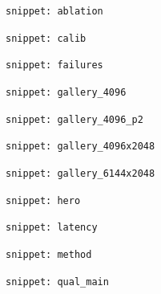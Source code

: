 \documentclass{article}
\begin{document}
\noindent\texttt{snippet: ablation}\par
\clearpage
\noindent\texttt{snippet: calib}\par
\clearpage
\noindent\texttt{snippet: failures}\par
\clearpage
\noindent\texttt{snippet: gallery\_4096}\par
\clearpage
\noindent\texttt{snippet: gallery\_4096\_p2}\par
\clearpage
\noindent\texttt{snippet: gallery\_4096x2048}\par
\clearpage
\noindent\texttt{snippet: gallery\_6144x2048}\par
\clearpage
\noindent\texttt{snippet: hero}\par
\clearpage
\noindent\texttt{snippet: latency}\par
\clearpage
\noindent\texttt{snippet: method}\par
\clearpage
\noindent\texttt{snippet: qual\_main}\par
\clearpage
\end{document}
